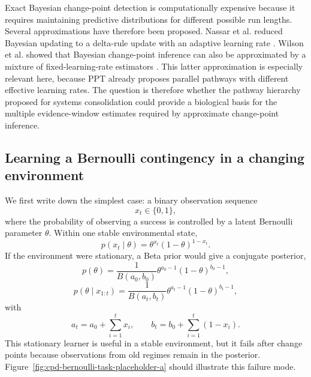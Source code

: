 Exact Bayesian change-point detection is computationally expensive because it requires maintaining predictive distributions for different possible run lengths. Several approximations have therefore been proposed. Nassar et al. reduced Bayesian updating to a delta-rule update with an adaptive learning rate \citep{Nassar2010}. Wilson et al. showed that Bayesian change-point inference can also be approximated by a mixture of fixed-learning-rate estimators \citep{Wilson2013}. This latter approximation is especially relevant here, because PPT already proposes parallel pathways with different effective learning rates. The question is therefore whether the pathway hierarchy proposed for systems consolidation could provide a biological basis for the multiple evidence-window estimates required by approximate change-point inference.

\subsection{Learning a Bernoulli contingency in a changing environment}
\label{sec:cpd-a-bernoulli}

We first write down the simplest case: a binary observation sequence
\begin{equation}
    x_t \in \{0,1\},
\end{equation}
where the probability of observing a success is controlled by a latent Bernoulli parameter \(\theta\). Within one stable environmental state,
\begin{equation}
    p(x_t \mid \theta)=\theta^{x_t}(1-\theta)^{1-x_t}.
\end{equation}
If the environment were stationary, a Beta prior would give a conjugate posterior,
\begin{equation}
    p(\theta)=\frac{1}{B(a_0,b_0)}\theta^{a_0-1}(1-\theta)^{b_0-1},
\end{equation}
\begin{equation}
    p(\theta \mid x_{1:t})
    =\frac{1}{B(a_t,b_t)}\theta^{a_t-1}(1-\theta)^{b_t-1},
\end{equation}
with
\begin{equation}
    a_t=a_0+\sum_{i=1}^{t}x_i,
    \qquad
    b_t=b_0+\sum_{i=1}^{t}(1-x_i).
\end{equation}
This stationary learner is useful in a stable environment, but it fails after change points because observations from old regimes remain in the posterior. Figure~\ref{fig:cpd-bernoulli-task-placeholder-a} should illustrate this failure mode.

